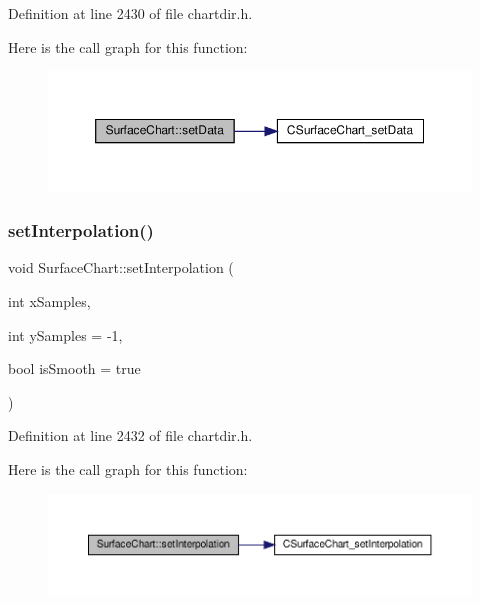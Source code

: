 Definition at line 2430 of file chartdir.\+h.

Here is the call graph for this function\+:
\nopagebreak
\begin{figure}[H]
\begin{center}
\leavevmode
\includegraphics[width=350pt]{class_surface_chart_a30e7444d85c949637b7f4a395db57120_cgraph}
\end{center}
\end{figure}
\mbox{\label{class_surface_chart_a41aa8666548588bb1cb3baf266f96b44}} 
\subsubsection{\texorpdfstring{set\+Interpolation()}{setInterpolation()}}
{\footnotesize\ttfamily void Surface\+Chart\+::set\+Interpolation (\begin{DoxyParamCaption}\item[{int}]{x\+Samples,  }\item[{int}]{y\+Samples = {\ttfamily -\/1},  }\item[{bool}]{is\+Smooth = {\ttfamily true} }\end{DoxyParamCaption})\hspace{0.3cm}{\ttfamily [inline]}}



Definition at line 2432 of file chartdir.\+h.

Here is the call graph for this function\+:
\nopagebreak
\begin{figure}[H]
\begin{center}
\leavevmode
\includegraphics[width=350pt]{class_surface_chart_a41aa8666548588bb1cb3baf266f96b44_cgraph}
\end{center}
\end{figure}
\mbox{\label{class_surface_chart_a6d1f1a35b9008f3d1352a9b2d335196c}} 

